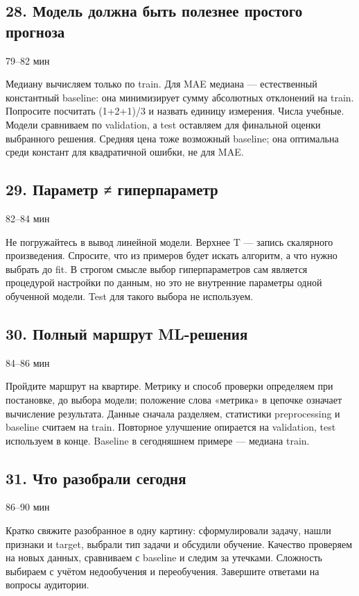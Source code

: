 \documentclass[11pt,a4paper]{article}
\newcommand{\timing}[1]{\hfill{\small\color{blue}#1}}
\begin{document}
\subsection{28. Модель должна быть полезнее простого прогноза}
\timing{79–82 мин}

Медиану вычисляем только по train. Для MAE медиана — естественный константный baseline: она минимизирует сумму абсолютных отклонений на train. Попросите посчитать (1+2+1)/3 и назвать единицу измерения. Числа учебные. Модели сравниваем по validation, а test оставляем для финальной оценки выбранного решения. Средняя цена тоже возможный baseline; она оптимальна среди констант для квадратичной ошибки, не для MAE.

\subsection{29. Параметр ≠ гиперпараметр}
\timing{82–84 мин}

Не погружайтесь в вывод линейной модели. Верхнее T — запись скалярного произведения. Спросите, что из примеров будет искать алгоритм, а что нужно выбрать до fit. В строгом смысле выбор гиперпараметров сам является процедурой настройки по данным, но это не внутренние параметры одной обученной модели. Test для такого выбора не используем.

\subsection{30. Полный маршрут ML-решения}
\timing{84–86 мин}

Пройдите маршрут на квартире. Метрику и способ проверки определяем при постановке, до выбора модели; положение слова «метрика» в цепочке означает вычисление результата. Данные сначала разделяем, статистики preprocessing и baseline считаем на train. Повторное улучшение опирается на validation, test используем в конце. Baseline в сегодняшнем примере — медиана train.

\subsection{31. Что разобрали сегодня}
\timing{86–90 мин}

Кратко свяжите разобранное в одну картину: сформулировали задачу, нашли признаки и target, выбрали тип задачи и обсудили обучение. Качество проверяем на новых данных, сравниваем с baseline и следим за утечками. Сложность выбираем с учётом недообучения и переобучения. Завершите ответами на вопросы аудитории.
\end{document}
